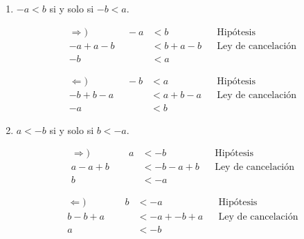 \begin{enumerate}[label=\alph*)]
\begin{enumerate}[label=\roman*)]
  \item $-a<b$ si y solo si $-b<a$.
  \begin{center}\vspace{-1em}
  \begin{minipage}[l]{.5\linewidth}
   \begin{align*}
    \Rightarrow) \qquad \qquad -a &< b && \text{Hipótesis}\\
    -a+a-b &< b +a-b && \text{Ley de cancelación}\\
    -b &< a%
   \end{align*}
  \end{minipage}%
  \begin{minipage}[r]{.5\linewidth}
   \begin{align*}
    \Leftarrow) \qquad \qquad   -b &< a && \text{Hipótesis}\\
    -b + b-a &< a + b-a && \text{Ley de cancelación}\\
    -a &< b%
   \end{align*}
  \end{minipage}
  \end{center}
  \item $a<-b$ si y solo si $b<-a$.
  \begin{center}\vspace{-1em}
  \begin{minipage}[l]{.3\linewidth}
   \begin{align*}
    \Rightarrow) \qquad \qquad
    a &< -b && \text{Hipótesis}\\
    a - a + b &< -b -a +b && \text{Ley de cancelación}\\
    b &< -a%
   \end{align*}
  \end{minipage}%
  \begin{minipage}[r]{.3\linewidth}
   \begin{align*}
    \Leftarrow) \qquad \qquad
    b &< -a && \text{Hipótesis}\\
    b -b +a &< -a + -b +a && \text{Ley de cancelación}\\
    a &< -b%

\end{align*}
\end{minipage}
\end{center}
\end{enumerate}
\end{enumerate}
